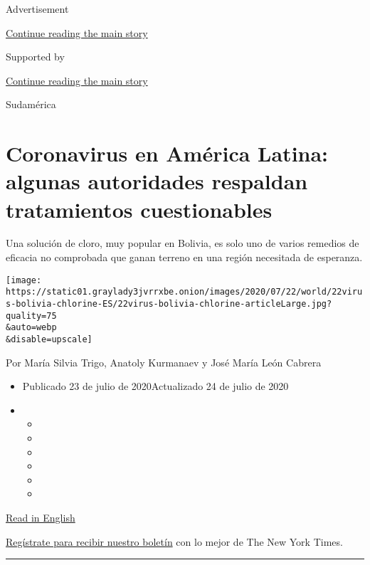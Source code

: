 Advertisement

\protect\hyperlink{after-top}{Continue reading the main story}

Supported by

\protect\hyperlink{after-sponsor}{Continue reading the main story}

Sudamérica

\hypertarget{coronavirus-en-amuxe9rica-latina-algunas-autoridades-respaldan-tratamientos-cuestionables}{%
\section{Coronavirus en América Latina: algunas autoridades respaldan
tratamientos
cuestionables}\label{coronavirus-en-amuxe9rica-latina-algunas-autoridades-respaldan-tratamientos-cuestionables}}

Una solución de cloro, muy popular en Bolivia, es solo uno de varios
remedios de eficacia no comprobada que ganan terreno en una región
necesitada de esperanza.

\texttt{[image: https://static01.graylady3jvrrxbe.onion/images/2020/07/22/world/22virus-bolivia-chlorine-ES/22virus-bolivia-chlorine-articleLarge.jpg?quality=75\\\&auto=webp\\\&disable=upscale]}

Por María Silvia Trigo, Anatoly Kurmanaev y José María León Cabrera

\begin{itemize}
\item
  Publicado 23 de julio de 2020Actualizado 24 de julio de 2020
\item
  \begin{itemize}
  \item
  \item
  \item
  \item
  \item
  \item
  \end{itemize}
\end{itemize}

\href{https://www.nytimes3xbfgragh.onion/2020/07/23/world/americas/chlorine-coronavirus-bolivia-latin-america.html}{Read
in English}

\href{https://www.nytimes3xbfgragh.onion/newsletters/el-times}{Regístrate
para recibir nuestro boletín} con lo mejor de The New York Times.

\begin{center}\rule{0.5\linewidth}{\linethickness}\end{center}

